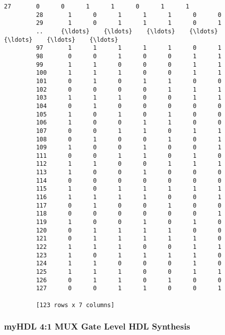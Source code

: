 \documentclass[11pt]{article}
\begin{document}
\begin{Verbatim}[commandchars=\\\{\}]
         27       0      0      1      1      0      1      1
         28       1      0      1      1      1      0      0
         29       1      0      1      1      1      0      1
         ..     {\ldots}    {\ldots}    {\ldots}    {\ldots}    {\ldots}    {\ldots}    {\ldots}
         97       1      1      1      1      1      0      1
         98       0      0      1      0      0      1      1
         99       1      1      0      0      0      1      1
         100      1      1      1      0      0      1      1
         101      0      1      0      1      1      0      0
         102      0      0      0      0      1      1      1
         103      1      1      1      0      0      1      1
         104      0      1      0      0      0      0      0
         105      1      0      1      0      1      0      0
         106      1      0      0      1      1      0      0
         107      0      0      1      1      0      1      1
         108      0      1      0      0      1      0      1
         109      1      0      0      1      0      0      1
         111      0      0      1      1      0      1      0
         112      1      1      0      0      1      1      1
         113      1      0      0      1      0      0      0
         114      0      0      0      0      0      0      0
         115      1      0      1      1      1      1      1
         116      1      1      1      1      0      0      1
         117      0      1      0      0      1      0      0
         118      0      0      0      0      0      0      1
         119      1      0      0      1      0      1      0
         120      0      1      1      1      1      0      0
         121      0      1      1      1      1      1      0
         122      1      1      1      0      0      1      1
         123      1      0      1      1      1      1      0
         124      1      1      0      0      0      1      0
         125      1      1      1      0      0      1      1
         126      0      1      1      0      1      0      0
         127      0      0      1      1      0      0      1
         
         [123 rows x 7 columns]
\end{Verbatim}
            
    \subsubsection{myHDL 4:1 MUX Gate Level HDL
Synthesis}\label{myhdl-41-mux-gate-level-hdl-synthesis}
\end{document}
